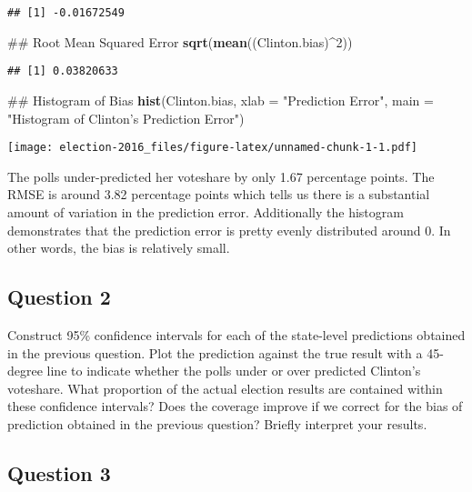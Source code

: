 \documentclass[]{article}
\newenvironment{Shaded}{\begin{snugshade}}{\end{snugshade}}
\newcommand{\KeywordTok}[1]{\textcolor[rgb]{0.13,0.29,0.53}{\textbf{{#1}}}}
\newcommand{\DataTypeTok}[1]{\textcolor[rgb]{0.13,0.29,0.53}{{#1}}}
\newcommand{\DecValTok}[1]{\textcolor[rgb]{0.00,0.00,0.81}{{#1}}}
\newcommand{\StringTok}[1]{\textcolor[rgb]{0.31,0.60,0.02}{{#1}}}
\newcommand{\NormalTok}[1]{{#1}}
\begin{document}
\begin{verbatim}
## [1] -0.01672549
\end{verbatim}

\begin{Shaded}
\begin{Highlighting}[]
\NormalTok{## Root Mean Squared Error}
\KeywordTok{sqrt}\NormalTok{(}\KeywordTok{mean}\NormalTok{((Clinton.bias)^}\DecValTok{2}\NormalTok{))}
\end{Highlighting}
\end{Shaded}

\begin{verbatim}
## [1] 0.03820633
\end{verbatim}

\begin{Shaded}
\begin{Highlighting}[]
\NormalTok{## Histogram of Bias}
\KeywordTok{hist}\NormalTok{(Clinton.bias, }\DataTypeTok{xlab =} \StringTok{"Prediction Error"}\NormalTok{,}
     \DataTypeTok{main =} \StringTok{"Histogram of Clinton's Prediction Error"}\NormalTok{)}
\end{Highlighting}
\end{Shaded}

\texttt{[image: election-2016\_files/figure-latex/unnamed-chunk-1-1.pdf]}

The polls under-predicted her voteshare by only 1.67 percentage points.
The RMSE is around 3.82 percentage points which tells us there is a
substantial amount of variation in the prediction error. Additionally
the histogram demonstrates that the prediction error is pretty evenly
distributed around 0. In other words, the bias is relatively small.

\subsection{Question 2}\label{question-2}

Construct 95\% confidence intervals for each of the state-level
predictions obtained in the previous question. Plot the prediction
against the true result with a 45-degree line to indicate whether the
polls under or over predicted Clinton's voteshare. What proportion of
the actual election results are contained within these confidence
intervals? Does the coverage improve if we correct for the bias of
prediction obtained in the previous question? Briefly interpret your
results.

\subsection{Question 3}\label{question-3}
\end{document}
